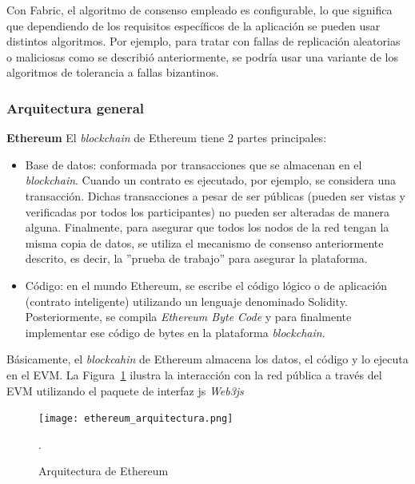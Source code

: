 Con Fabric, el algoritmo de consenso empleado es configurable, lo que significa que dependiendo de los requisitos específicos de la aplicación se pueden usar distintos algoritmos. Por ejemplo, para tratar con fallas de replicación aleatorias o maliciosas como se describió anteriormente, se podría usar una variante de los algoritmos de tolerancia a fallas bizantinos.

\subsubsection{Arquitectura general}
\textbf{Ethereum} \newline
El \textit{blockchain} de Ethereum tiene 2 partes principales:

\begin{itemize}
    \item Base de datos: conformada por transacciones que se almacenan en el \textit{blockchain}. Cuando un contrato es ejecutado, por ejemplo, se considera una transacción. Dichas transacciones a pesar de ser públicas (pueden ser vistas y verificadas por todos los participantes) no pueden ser alteradas de manera alguna. Finalmente, para asegurar  que todos los nodos de la red tengan la misma copia de datos, se utiliza el mecanismo de consenso anteriormente descrito, es decir, la ''prueba de trabajo'' para asegurar la plataforma.
    \item Código: en el mundo Ethereum, se escribe el código lógico o de aplicación (contrato inteligente) utilizando un lenguaje denominado Solidity. Posteriormente, se compila \textit{Ethereum Byte Code} y para finalmente implementar ese código de bytes en la plataforma \textit{blockchain}. 
\end{itemize}


Básicamente, el \textit{blockcahin} de Ethereum almacena los datos, el código y lo ejecuta en el EVM. La Figura~\ref{blockchain_ethereum_arquitecture} ilustra  la interacción con la red pública a través del EVM utilizando el paquete de interfaz js \textit{Web3js}

\begin{figure}[H]
    \centering
    \texttt{[image: ethereum\_arquitectura.png]}
     \caption{Arquitectura de Ethereum}. 
    \label{blockchain_ethereum_arquitecture}
\end{figure}

